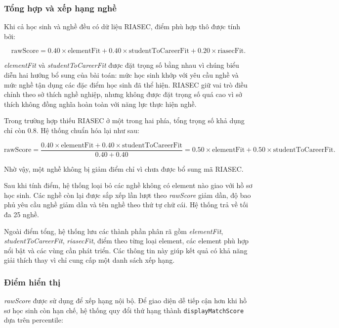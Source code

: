\subsubsection{Tổng hợp và xếp hạng nghề}

Khi cả học sinh và nghề đều có dữ liệu RIASEC, điểm phù hợp thô được tính bởi:

\begin{equation}
	\text{rawScore}
	=
	0.40 \times \text{elementFit}
	+
	0.40 \times \text{studentToCareerFit}
	+
	0.20 \times \text{riasecFit}.
\end{equation}

\textit{elementFit} và \textit{studentToCareerFit} được đặt trọng số bằng nhau vì chúng biểu diễn hai hướng bổ sung của bài toán: mức học sinh khớp với yêu cầu nghề và mức nghề tận dụng các đặc điểm học sinh đã thể hiện. RIASEC giữ vai trò điều chỉnh theo sở thích nghề nghiệp, nhưng không được đặt trọng số quá cao vì sở thích không đồng nghĩa hoàn toàn với năng lực thực hiện nghề.

Trong trường hợp thiếu RIASEC ở một trong hai phía, tổng trọng số khả dụng chỉ còn $0.8$. Hệ thống chuẩn hóa lại như sau:

\begin{equation}
	\text{rawScore}
	=
	\frac{
		0.40 \times \text{elementFit}
		+
		0.40 \times \text{studentToCareerFit}
	}{
		0.40+0.40
	}
	=
	0.50 \times \text{elementFit}
	+
	0.50 \times \text{studentToCareerFit}.
\end{equation}

Nhờ vậy, một nghề không bị giảm điểm chỉ vì chưa được bổ sung mã RIASEC.

Sau khi tính điểm, hệ thống loại bỏ các nghề không có element nào giao với hồ sơ học sinh. Các nghề còn lại được sắp xếp lần lượt theo \textit{rawScore} giảm dần, độ bao phủ yêu cầu nghề giảm dần và tên nghề theo thứ tự chữ cái. Hệ thống trả về tối đa 25 nghề.

Ngoài điểm tổng, hệ thống lưu các thành phần phân rã gồm \textit{elementFit}, \textit{studentToCareerFit}, \textit{riasecFit}, điểm theo từng loại element, các element phù hợp nổi bật và các vùng cần phát triển. Các thông tin này giúp kết quả có khả năng giải thích thay vì chỉ cung cấp một danh sách xếp hạng.

\subsubsection{Điểm hiển thị}

\textit{rawScore} được sử dụng để xếp hạng nội bộ. Để giao diện dễ tiếp cận hơn khi hồ sơ học sinh còn hạn chế, hệ thống quy đổi thứ hạng thành \texttt{displayMatchScore} dựa trên percentile:

